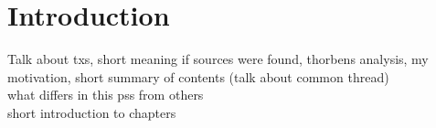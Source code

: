 \chapter{Introduction}
Talk about txs, short meaning if sources were found, thorbens analysis, my motivation, short summary of contents (talk about common thread)\\

what differs in this pss from others\\
short introduction to chapters\\
